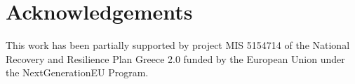\section*{Acknowledgements}

This work has been partially supported by project MIS 5154714 of the National Recovery and Resilience Plan Greece 2.0 funded
by the European Union under the NextGenerationEU Program.